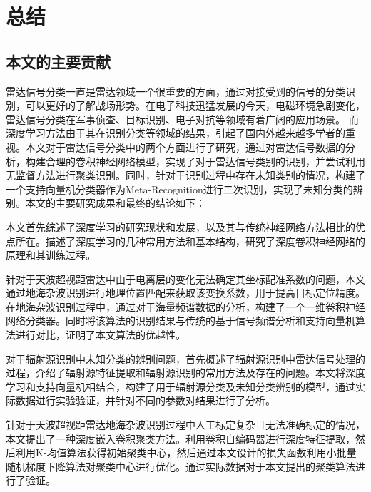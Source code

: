 \chapter{总结}
\section{本文的主要贡献}
雷达信号分类一直是雷达领域一个很重要的方面，通过对接受到的信号的分类识别，可以更好的了解战场形势。在电子科技迅猛发展的今天，电磁环境急剧变化，雷达信号分类在军事侦查、目标识别、电子对抗等领域有着广阔的应用场景。
而深度学习方法由于其在识别分类等领域的结果，引起了国内外越来越多学者的重视。本文对于雷达信号分类中的两个方面进行了研究，通过对雷达信号数据的分析，构建合理的卷积神经网络模型，实现了对于雷达信号类别的识别，并尝试利用无监督方法进行聚类识别。同时，针对于识别过程中存在未知类别的情况，构建了一个支持向量机分类器作为Meta-Recognition进行二次识别，实现了未知分类的辨别。本文的主要研究成果和最终的结论如下：

本文首先综述了深度学习的研究现状和发展，以及其与传统神经网络方法相比的优点所在。描述了深度学习的几种常用方法和基本结构，研究了深度卷积神经网络的原理和其训练过程。

针对于天波超视距雷达中由于电离层的变化无法确定其坐标配准系数的问题，本文通过地海杂波识别进行地理位置匹配来获取该变换系数，用于提高目标定位精度。在地海杂波识别过程中，通过对于海量频谱数据的分析，构建了一个一维卷积神经网络分类器。同时将该算法的识别结果与传统的基于信号频谱分析和支持向量机算法进行对比，证明了本文算法的优越性。

对于辐射源识别中未知分类的辨别问题，首先概述了辐射源识别中雷达信号处理的过程，介绍了辐射源特征提取和辐射源识别的常用方法及存在的问题。本文将深度学习和支持向量机相结合，构建了用于辐射源分类及未知分类辨别的模型，通过实际数据进行实验验证，并针对不同的参数对结果进行了分析。

针对于天波超视距雷达地海杂波识别过程中人工标定复杂且无法准确标定的情况，本文提出了一种深度嵌入卷积聚类方法。利用卷积自编码器进行深度特征提取，然后利用K-均值算法获得初始聚类中心，然后通过本文设计的损失函数利用小批量随机梯度下降算法对聚类中心进行优化。通过实际数据对于本文提出的聚类算法进行了验证。

